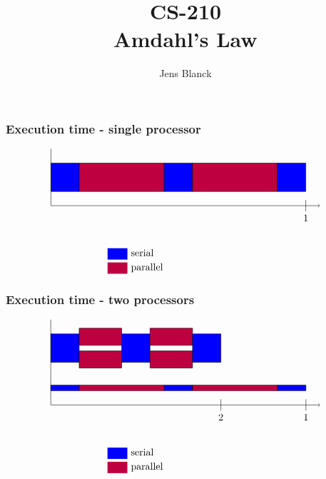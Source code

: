 \documentclass{beamer}
\title{CS-210\\Amdahl's Law}
\author{Jens Blanck}
\date{}
\begin{document}
\begin{frame}
  \titlepage
\end{frame}

\begin{frame}
  \frametitle{Execution time - single processor}
\[
  \tikz{
    \draw[->] (0,1.5) -- (0,-0.5) -- (9.5,-0.5);
    \filldraw[draw,fill=blue] (0,0) rectangle +(1,1);
    \filldraw[draw,fill=purple] (1,0) rectangle +(3,1);
    \filldraw[draw,fill=blue] (4,0) rectangle +(1,1);
    \filldraw[draw,fill=purple] (5,0) rectangle +(3,1);
    \filldraw[draw,fill=blue] (8,0) rectangle +(1,1);
    \draw (9,-0.3) -- (9,-0.7) node [below] {1};
    \fill[fill=blue] (2,-2) rectangle +(0.7,-0.4) node [above right,text
    height=1.5ex,text depth=0ex] {serial};
    \fill[fill=purple] (2,-2.5) rectangle +(0.7,-0.4) node [above right,text
    height=1.5ex,text depth=0ex] {parallel};
  }
\]
\end{frame}

\begin{frame}
  \frametitle{Execution time - two processors}
\[
  \tikz{
    \draw[->] (0,2.5) -- (0,-0.5) -- (9.5,-0.5);
    \filldraw[draw,fill=blue] (0,0) rectangle +(1,0.2);
    \filldraw[draw,fill=purple] (1,0) rectangle +(3,0.2);
    \filldraw[draw,fill=blue] (4,0) rectangle +(1,0.2);
    \filldraw[draw,fill=purple] (5,0) rectangle +(3,0.2);
    \filldraw[draw,fill=blue] (8,0) rectangle +(1,0.2);
    \filldraw[draw,fill=blue] (0,1) rectangle +(1,1);
    \filldraw[draw,fill=purple] (1,0.8) rectangle +(1.5,0.6);
    \filldraw[draw,fill=purple] (1,1.6) rectangle +(1.5,0.6);
    \filldraw[draw,fill=blue] (2.5,1) rectangle +(1,1);
    \filldraw[draw,fill=purple] (3.5,0.8) rectangle +(1.5,0.6);
    \filldraw[draw,fill=purple] (3.5,1.6) rectangle +(1.5,0.6);
    \filldraw[draw,fill=blue] (5,1) rectangle +(1,1);
    \draw (9,-0.3) -- (9,-0.7) node [below] {1};
    \draw (6,-0.3) -- (6,-0.7) node [below] {2};
    \fill[fill=blue] (2,-2) rectangle +(0.7,-0.4) node [above right,text
    height=1.5ex,text depth=0ex] {serial};
    \fill[fill=purple] (2,-2.5) rectangle +(0.7,-0.4) node [above right,text
    height=1.5ex,text depth=0ex] {parallel};
  }
\]
\end{frame}
\end{document}
